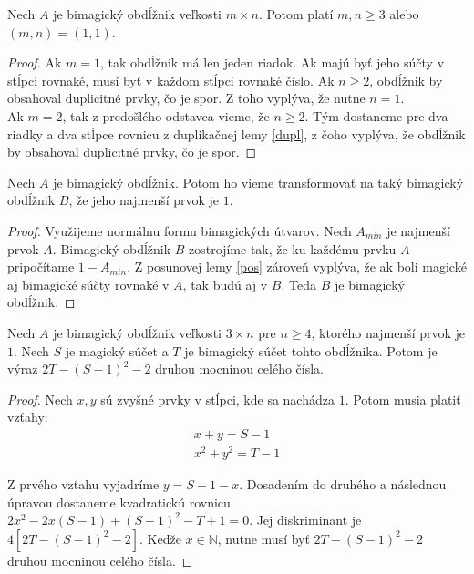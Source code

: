 \begin{theorem}
\label{rectanglemn}
Nech $A$ je bimagický obdĺžnik veľkosti $m \times n$. Potom platí $m,n \geq 3$ alebo $(m, n) = (1, 1)$.
\end{theorem}

\begin{proof} Ak $m = 1$, tak obdĺžnik má len jeden riadok. Ak majú byť jeho súčty v stĺpci rovnaké, musí byť v každom stĺpci rovnaké číslo. Ak $n \geq 2$, obdĺžnik by obsahoval duplicitné prvky, čo je spor. Z toho vyplýva, že nutne $n = 1$. \\

Ak $m = 2$, tak z predošlého odstavca vieme, že $n \geq 2$. Tým dostaneme pre dva riadky a dva stĺpce rovnicu z duplikačnej lemy \ref{dupl}, z čoho vyplýva, že obdĺžnik by obsahoval duplicitné prvky, čo je spor.
\end{proof}

\begin{theorem} 
\label{rectangle1}
Nech $A$ je bimagický obdĺžnik. Potom ho vieme transformovať na taký bimagický obdĺžnik $B$, že jeho najmenší prvok je $1$.
\end{theorem}

\begin{proof} Využijeme normálnu formu bimagických útvarov. Nech $A_{min}$ je najmenší prvok $A$. Bimagický obdĺžnik $B$ zostrojíme tak, že ku každému prvku $A$ pripočítame $1 - A_{min}$. Z posunovej lemy \ref{pos} zároveň vyplýva, že ak boli magické aj bimagické súčty rovnaké v $A$, tak budú aj v $B$. Teda $B$ je bimagický obdĺžnik.
\end{proof}

\begin{theorem} 
\label{rectangle1cond}
Nech $A$ je bimagický obdĺžnik veľkosti $3 \times n$ pre $n \geq 4$, ktorého najmenší prvok je $1$. Nech $S$ je magický súčet a $T$ je bimagický súčet tohto obdĺžnika. Potom je výraz $2T - (S-1)^2 - 2$ druhou mocninou celého čísla.
\end{theorem}

\begin{proof}
Nech $x,y$ sú zvyšné prvky v stĺpci, kde sa nachádza $1$. Potom musia platiť vzťahy:
\begin{gather*}
x + y = S - 1 \\
x^2 + y^2 = T - 1
\end{gather*}

Z prvého vzťahu vyjadríme $y = S - 1 - x$. Dosadením do druhého a následnou úpravou dostaneme kvadratickú rovnicu $2x^2 - 2x(S - 1) + (S - 1)^2 - T + 1 = 0$. Jej diskriminant je $4[2T - (S - 1)^2 - 2]$. Keďže $x \in \mathbb{N}$, nutne musí byť $2T - (S - 1)^2 - 2$ druhou mocninou celého čísla.
\end{proof}

